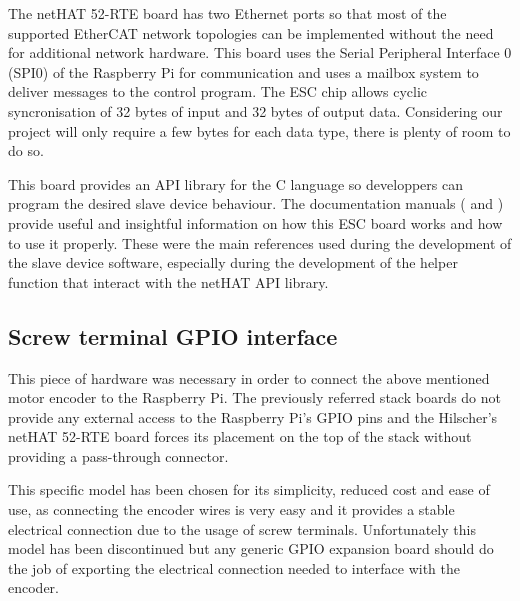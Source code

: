 The netHAT 52-RTE board has two Ethernet ports so that most of the supported EtherCAT network topologies can be implemented without the need for additional network hardware.
This board uses the Serial Peripheral Interface 0 (SPI0) of the Raspberry Pi for communication and uses a mailbox system to deliver messages to the control program.
The ESC chip allows cyclic syncronisation of 32 bytes of input and 32 bytes of output data.
Considering our project will only require a few bytes for each data type, there is plenty of room to do so.

This board provides an API library for the C language so developpers can program the desired slave device behaviour.
The documentation manuals (\cite{nethat:cifx_api_docs} and \cite{nethat:ethercat_api_docs}) provide useful and insightful information on how this ESC board works and how to use it properly.
These were the main references used during the development of the slave device software, especially during the development of the helper function that interact with the netHAT API library.

\subsection{Screw terminal GPIO interface}
This piece of hardware was necessary in order to connect the above mentioned motor encoder to the Raspberry Pi.
The previously referred stack boards do not provide any external access to the Raspberry Pi's GPIO pins and the Hilscher's netHAT 52-RTE board forces its placement on the top of the stack without providing a pass-through connector.

This specific model has been chosen for its simplicity, reduced cost and ease of use, as connecting the encoder wires is very easy and it provides a stable electrical connection due to the usage of screw terminals.
Unfortunately this model has been discontinued but any generic GPIO expansion board should do the job of exporting the electrical connection needed to interface with the encoder.
